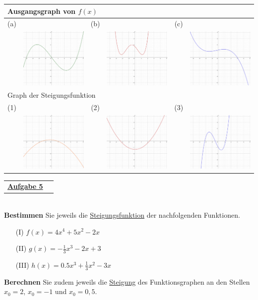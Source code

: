 \documentclass[oneside,openany,headings=optiontotoc,11pt,numbers=noenddot]{scrreprt}
\begin{document}
	\begin{tabularx}{\textwidth}{|cX|cX|cX|}
		\hline
		\multicolumn{6}{|l|}{Ausgangsgraph von \(f(x)\)}\\
		\hline
		(a) & & (b) & & (c) &\\
		& \includegraphics[scale=0.14]{../99_Bilder/3VKA/a.jpg} & & \includegraphics[scale=0.14]{../99_Bilder/3VKA/b.jpg} & & \includegraphics[scale=0.14]{../99_Bilder/3VKA/c.jpg}\\
		\hline
		\multicolumn{6}{|l|}{Graph der Steigungsfunktion}\\
		\hline
		(1) & & (2) & & (3) &\\
		& \includegraphics[scale=0.14]{../99_Bilder/3VKA/c-.jpg} & & \includegraphics[scale=0.14]{../99_Bilder/3VKA/a-.jpg} & & \includegraphics[scale=0.14]{../99_Bilder/3VKA/b-.jpg}\\
		\hline
	\end{tabularx}
	\par\noindent
	\begin{tabularx}{\textwidth}{Xl}\underline{\textbf{Aufgabe 5}}&\end{tabularx}\\
	\textbf{Bestimmen} Sie jeweils die \underline{Steigungsfunktion} der nachfolgenden Funktionen.
	\begin{itemize}
		\item[(I)] \(f(x) = 4x^4 + 5x^2 -2x\)
		\item[(II)] \(g(x) = -\frac{1}{3}x^3 - 2x + 3\)
		\item[(III)] \(h(x) = 0.5x^3 + \frac{1}{3}x^2 - 3x\)
	\end{itemize}
	\textbf{Berechnen} Sie zudem jeweils die \underline{Steigung} des Funktionsgraphen an den Stellen \(x_0 = 2\), \(x_0 = -1\) und \(x_0 = 0,5\).
\end{document}
